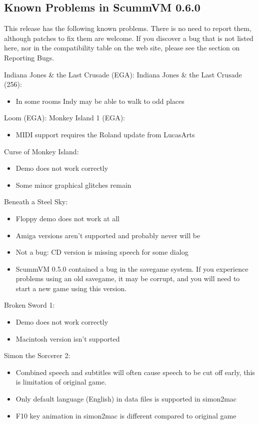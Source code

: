 

\subsection{Known Problems in ScummVM 0.6.0}

This release has the following known problems. There is no need to report them,
although patches to fix them are welcome. If you discover a bug that is not
listed here, nor in the compatibility table on the web site, please see
the section on Reporting Bugs.

Indiana Jones \& the Last Crusade (EGA):
Indiana Jones \& the Last Crusade (256):
  \begin{itemize}
  \item In some rooms Indy may be able to walk to odd places
  \end{itemize}
Loom (EGA):
Monkey Island 1 (EGA):
  \begin{itemize}
  \item MIDI support requires the Roland update from LucasArts
  \end{itemize}
Curse of Monkey Island:
  \begin{itemize}
  \item Demo does not work correctly
  \item Some minor graphical glitches remain
  \end{itemize}
Beneath a Steel Sky:
  \begin{itemize}
  \item Floppy demo does not work at all
  \item Amiga versions aren't supported and probably never will be
  \item Not a bug: CD version is missing speech for some dialog
  \item ScummVM 0.5.0 contained a bug in the savegame system.
                  If you experience problems using an old savegame, it may be
                  corrupt, and you will need to start a new game using this
                  version.
  \end{itemize}
Broken Sword 1:
  \begin{itemize}
  \item Demo does not work correctly
  \item Macintosh version isn't supported
  \end{itemize}
Simon the Sorcerer 2:
  \begin{itemize}
  \item Combined speech and subtitles will often cause speech to be
                  cut off early, this is limitation of original game.
  \item Only default language (English) in data files is supported
                  in simon2mac
  \item F10 key animation in simon2mac is different compared to
                  original game
  \end{itemize}
